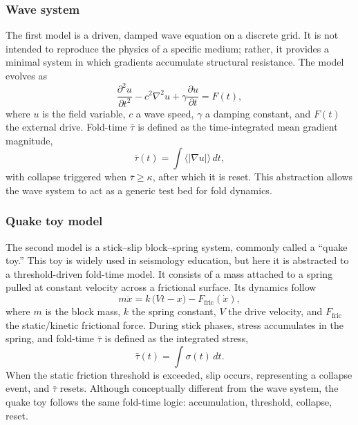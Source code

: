 \documentclass[12pt]{article}
\begin{document}
\subsubsection{Wave system}
The first model is a driven, damped wave equation on a discrete grid. It is not intended to reproduce the physics of a specific medium; rather, it provides a minimal system in which gradients accumulate structural resistance. The model evolves as
\begin{equation}
\frac{\partial^{2} u}{\partial t^{2}}
 - c^{2}\nabla^{2}u
 + \gamma \frac{\partial u}{\partial t}
 = F(t) ,
\label{eq:wave}
\end{equation}
where $u$ is the field variable, $c$ a wave speed, $\gamma$ a damping constant, and $F(t)$ the external drive.
Fold-time $\bar{\tau}$ is defined as the time-integrated mean gradient magnitude,
\begin{equation}
\bar{\tau}(t) = \int \! \langle |\nabla u| \rangle \, dt ,
\label{eq:tau-wave}
\end{equation}
with collapse triggered when $\bar{\tau}\geq\kappa$, after which it is reset.
This abstraction allows the wave system to act as a generic test bed for fold dynamics.
\subsubsection{Quake toy model}
The second model is a stick--slip block--spring system, commonly called a ``quake toy.'' This toy is widely used in seismology education, but here it is abstracted to a threshold-driven fold-time model.
It consists of a mass attached to a spring pulled at constant velocity across a frictional surface.
Its dynamics follow
\begin{equation}
m \ddot{x} = k \,\big(Vt - x\big) - F_{\mathrm{fric}}(\dot{x}) ,
\label{eq:quake}
\end{equation}
where $m$ is the block mass, $k$ the spring constant, $V$ the drive velocity, and $F_{\mathrm{fric}}$ the static/kinetic frictional force.
During stick phases, stress accumulates in the spring, and fold-time $\bar{\tau}$ is defined as the integrated stress,
\begin{equation}
\bar{\tau}(t) = \int \! \sigma(t)\, dt .
\label{eq:tau-quake}
\end{equation}
When the static friction threshold is exceeded, slip occurs, representing a collapse event, and $\bar{\tau}$ resets.
Although conceptually different from the wave system, the quake toy follows the same fold-time logic: accumulation, threshold, collapse, reset.
\end{document}
